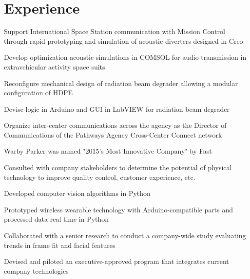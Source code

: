 \documentclass[]{deedy-resume-openfont}
\begin{document}
\begin{minipage}[t]{0.66\textwidth} 


\section{Experience}

\vspace{\topsep} %
\begin{tightemize}
\item Support International Space Station communication with Mission Control through rapid prototyping and simulation of acoustic diverters designed in Creo
\item Develop optimization acoustic simulations in COMSOL for audio transmission in extravehicular activity space suits
\item Reconfigure mechanical design of radiation beam degrader allowing a modular configuration of HDPE
\item Devise logic in Arduino and GUI in LabVIEW for radiation beam degrader
\item Organize inter-center communications across the agency as the Director of Communications of the Pathways Agency Cross-Center Connect network
\end{tightemize}
\sectionsep

\begin{tightemize}
\item Warby Parker was named "2015's Most Innovative Company" by Fast 
\item Consulted with company stakeholders to determine the potential of physical technology to improve quality control, customer experience, etc.
\item Developed computer vision algorithms in Python 
\item Prototyped wireless wearable technology with Arduino-compatible parts and processed data real time in Python
\item Collaborated with a senior research to conduct a company-wide study evaluating trends in frame fit and facial features
\item Devised and piloted an executive-approved program that integrates current company technologies
\end{tightemize}
\sectionsep


\end{minipage}
\end{document}

